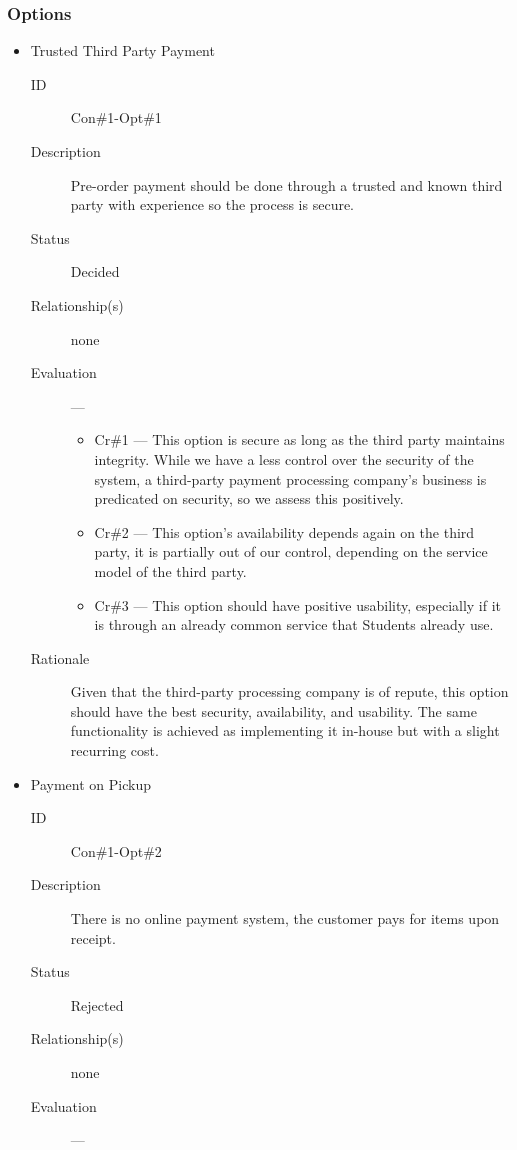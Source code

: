 \documentclass[11pt]{article}
\begin{document}
\subsubsection*{Options}
\label{sec:org533833f}
\begin{itemize}
\item Trusted Third Party Payment
\label{sec:org5e6b9df}
\begin{description}
\item[{ID}] Con\#1-Opt\#1
\item[{Description}] Pre-order payment should be done through a
trusted and known third party with experience so
the process is secure.
\item[{Status}] Decided
\item[{Relationship(s)}] none
\item[{Evaluation}] ---
\begin{itemize}
\item Cr\#1 --- This option is secure as long as the third party
maintains integrity. While we have a less control over the
security of the system, a third-party payment processing
company's business is predicated on security, so we assess
this positively.
\item Cr\#2 --- This option's availability depends again on the
third party, it is partially out of our control, depending on
the service model of the third party.
\item Cr\#3 --- This option should have positive usability,
especially if it is through an already common service that
Students already use.
\end{itemize}
\item[{Rationale}] Given that the third-party processing company is
of repute, this option should have the best
security, availability, and usability. The same
functionality is achieved as implementing it
in-house but with a slight recurring cost.
\end{description}
\item Payment on Pickup
\label{sec:org626fb38}
\begin{description}
\item[{ID}] Con\#1-Opt\#2
\item[{Description}] There is no online payment system, the customer
pays for items upon receipt.
\item[{Status}] Rejected
\item[{Relationship(s)}] none
\item[{Evaluation}] ---
\begin{itemize}

\end{itemize}
\end{description}
\end{itemize}
\end{document}
